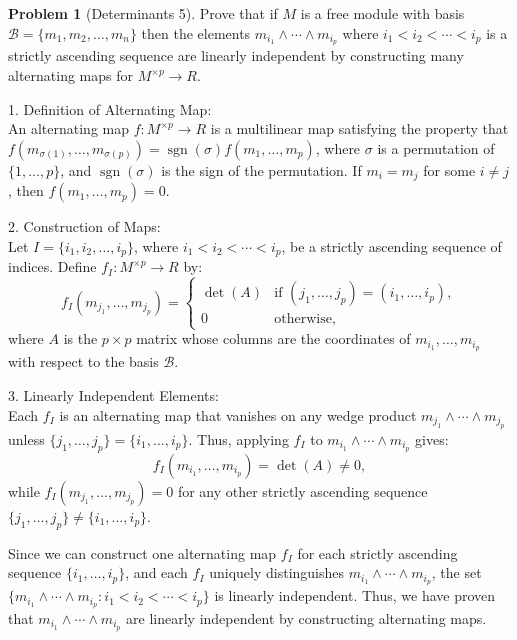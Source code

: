 \documentclass[12pt]{article}
\theoremstyle{definition}
\newtheorem{problem}{Problem}
\begin{document}
\begin{problem}[Determinants 5]
    Prove that if $M$ is a free module with basis $\mathcal{B} = \{m_1, m_2, \ldots, m_n\}$
    then the elements $m_{i_1} \wedge \cdots \wedge m_{i_p}$ where $i_1 < i_2 < \cdots < i_p$
    is a strictly ascending sequence are linearly independent by constructing many alternating
    maps for $M^{\times p} \longrightarrow R$.

    \begin{solution}
        1. Definition of Alternating Map:\\  
        An alternating map \( f: M^{\times p} \to R \) is a multilinear map satisfying the property that\\
        \( f(m_{\sigma(1)}, \ldots, m_{\sigma(p)}) = \operatorname{sgn}(\sigma) f(m_1, \ldots, m_p) \), where \( \sigma \) is a permutation of \( \{1, \ldots, p\} \), and \( \operatorname{sgn}(\sigma) \) is the sign of the permutation. If \( m_i = m_j \) for some \( i \neq j \), then \( f(m_1, \ldots, m_p) = 0 \).

        2. Construction of Maps:\\
        Let \( I = \{i_1, i_2, \ldots, i_p\} \), where \( i_1 < i_2 < \cdots < i_p \), be a strictly ascending sequence of indices. Define \( f_I: M^{\times p} \to R \) by:
        \[
        f_I(m_{j_1}, \ldots, m_{j_p}) =
        \begin{cases}
            \det(A) & \text{if } (j_1, \ldots, j_p) = (i_1, \ldots, i_p), \\
            0       & \text{otherwise},
        \end{cases}
        \]
        where \( A \) is the \( p \times p \) matrix whose columns are the coordinates of \( m_{i_1}, \ldots, m_{i_p} \) with respect to the basis \( \mathcal{B} \).

        3. Linearly Independent Elements:\\  
        Each \( f_I \) is an alternating map that vanishes on any wedge product \( m_{j_1} \wedge \cdots \wedge m_{j_p} \) unless \( \{j_1, \ldots, j_p\} = \{i_1, \ldots, i_p\} \). Thus, applying \( f_I \) to \( m_{i_1} \wedge \cdots \wedge m_{i_p} \) gives:
        \[
        f_I(m_{i_1}, \ldots, m_{i_p}) = \det(A) \neq 0,
        \]
        while \( f_I(m_{j_1}, \ldots, m_{j_p}) = 0 \) for any other strictly ascending sequence \( \{j_1, \ldots, j_p\} \neq \{i_1, \ldots, i_p\} \).
 
        Since we can construct one alternating map \( f_I \) for each strictly ascending sequence \( \{i_1, \ldots, i_p\} \), and each \( f_I \) uniquely distinguishes \( m_{i_1} \wedge \cdots \wedge m_{i_p} \), the set \( \{m_{i_1} \wedge \cdots \wedge m_{i_p} : i_1 < i_2 < \cdots < i_p\} \) is linearly independent. 
        Thus, we have proven that \( m_{i_1} \wedge \cdots \wedge m_{i_p} \) are linearly independent by constructing alternating maps.

    \end{solution}
\end{problem}
\end{document}
